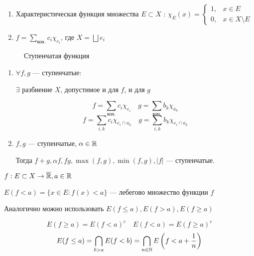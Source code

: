 \begin{example}\itemfix
    \begin{enumerate}
        \item Характеристическая функция множества \(E\subset X\) : \(\chi_E(x) = \begin{cases}
                  1, & x\in E            \\
                  0, & x\in X\setminus E
              \end{cases}\)
        \item \(f = \sum\limits_{\text{кон.}} c_i \chi_{e_i}\), где \(X = \bigsqcup e_i\)
    \end{enumerate}
\end{example}

\begin{figure}[h]
    \centering
    
    \caption{Ступенчатая функция}
\end{figure}

\begin{prop}\itemfix
    \begin{enumerate}
        \item \(\forall f, g\) --- ступенчатые:

              \(\exists \) разбиение \(X\), допустимое и для \(f\), и для \(g\)

              \[f = \sum\limits_{\text{кон.}} c_i \chi_{e_i} \quad g = \sum\limits_{\text{кон.}} b_k \chi_{a_k}\]
              \[f = \sum\limits_{i, k} c_i \chi_{e_i \cap a_k} \quad g = \sum\limits_{i, k} b_k \chi_{e_i \cap a_k}\]
        \item \(f, g\) --- ступенчатые, \(\alpha\in\mathbb{R}\)

              Тогда \(f + g, \alpha f, fg, \max(f, g), \min(f, g), |f|\) --- ступенчатые.
    \end{enumerate}
\end{prop}

\begin{definition}
    \(f : E\subset X \to \overline {\mathbb{R}}, a\in\mathbb{R}\)

    \(E(f < a) = \{x\in E : f(x) < a\} \) --- лебегово множество функции \(f\)

    Аналогично можно использовать \(E(f \leq a), E(f > a), E(f \geq a)\)
\end{definition}

\begin{remark}
    \[E(f \geq a) = E(f < a)^c \quad E(f < a) = E(f \geq a)^c\]
    \[E(f \leq a) = \bigcap_{b > a} E(f < b) = \bigcap_{n\in\mathbb{N}} E\left(f < a + \frac{1}{n}\right)\]
\end{remark}

